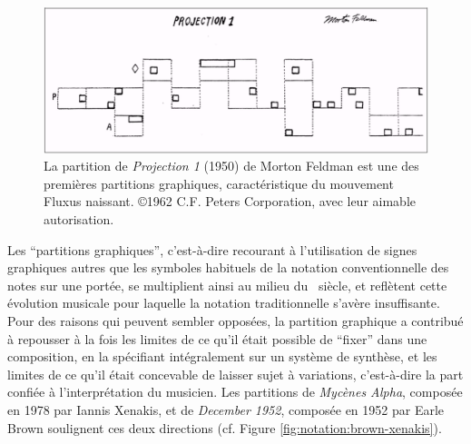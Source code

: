 \begin{figure}[!htbp]
	\captionsetup{format=plain}
	\includegraphics[width=\textwidth]{gfx/notation/MortonFeldman-Projection1.png}
	\caption[La partition de \textit{Projection 1} de Morton Feldman]{La partition de \textit{Projection 1} (1950) de Morton Feldman est une des premières partitions graphiques, caractéristique du mouvement Fluxus naissant. ©1962 C.F. Peters Corporation, avec leur aimable autorisation.}
	\label{fig:notation:feldman}
\end{figure}
\indent Les ``partitions graphiques'', c'est-à-dire recourant à l'utilisation de signes graphiques autres que les symboles habituels de la notation conventionnelle des notes sur une portée, se multiplient ainsi au milieu du ~siècle, et reflètent cette évolution musicale pour laquelle la notation traditionnelle s'avère insuffisante. Pour des raisons qui peuvent sembler opposées, la partition graphique a contribué à repousser à la fois les limites de ce qu'il était possible de ``fixer'' dans une composition, en la spécifiant intégralement sur un système de synthèse, et les limites de ce qu'il était concevable de laisser sujet à variations, c'est-à-dire la part confiée à l'interprétation du musicien. Les partitions de \textit{Mycènes Alpha}, composée en 1978 par Iannis Xenakis, et de \textit{December 1952}, composée en 1952 par Earle Brown soulignent ces deux directions (cf. Figure \ref{fig:notation:brown-xenakis}).
